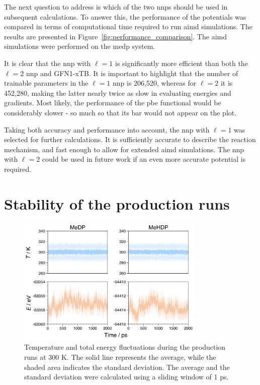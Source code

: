 The next question to address is which of the two \acp{nnp} should be used in subsequent calculations. To answer this, the performance of the potentials was compared in terms of computational time required to run \ac{aimd} simulations. The results are presented in Figure~\ref{fig:performance_comparison}. The \ac{aimd} simulations were performed on the \ac{medp} system.

It is clear that the \ac{nnp} with $\ell=1$ is significantly more efficient than both the $\ell=2$ \ac{nnp} and GFN1-xTB. It is important to highlight that the number of trainable parameters in the $\ell=1$ \ac{nnp} is 206,520, whereas for $\ell=2$ it is 452,280, making the latter nearly twice as slow in evaluating energies and gradients. Most likely, the performance of the \ac{pbe} functional would be considerably slower - so much so that its bar would not appear on the plot.

Taking both accuracy and performance into account, the \ac{nnp} with $\ell=1$ was selected for further calculations. It is sufficiently accurate to describe the reaction mechanism, and fast enough to allow for extended \ac{aimd} simulations. The \ac{nnp} with $\ell=2$ could be used in future work if an even more accurate potential is required.



\section{Stability of the production runs}

\begin{figure}[b!]
    \centering
    \includegraphics[width=0.8\textwidth]{Figures/4_Results/results_aimd_stability.png}
    \caption{Temperature and total energy fluctuations during the production runs at 300 K. The solid line represents the average, while the shaded area indicates the standard deviation. The average and the standard deviation were calculated using a sliding window of 1 ps.}
    \label{fig:temp_energy_fluctuations}
\end{figure}

